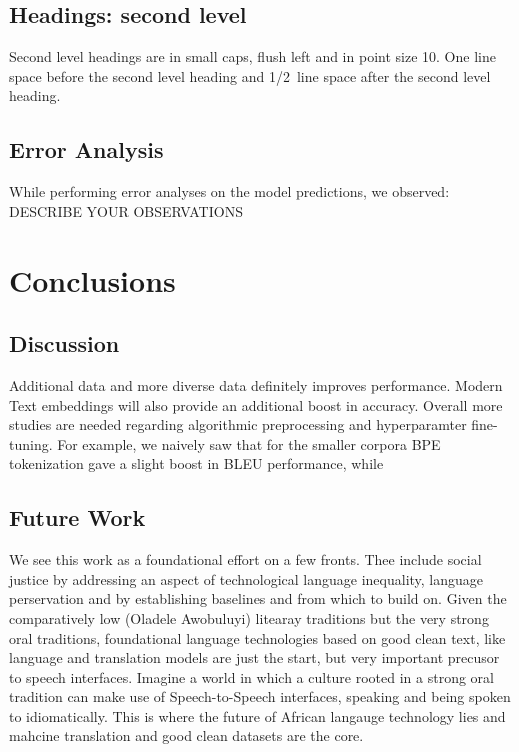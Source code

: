 \documentclass{article} %
\begin{document}
\subsection{Headings: second level}

Second level headings are in small caps,
flush left and in point size 10. One line space before the second level
heading and 1/2~line space after the second level heading.

\subsection{Error Analysis}
While performing error analyses on the model predictions, we observed: DESCRIBE YOUR OBSERVATIONS

\section{Conclusions}


\subsection{Discussion}
Additional data and more diverse data definitely improves performance. Modern Text embeddings will also provide an additional boost in accuracy. Overall more studies are needed regarding algorithmic preprocessing and hyperparamter fine-tuning. For example, we naively saw that for the smaller corpora BPE tokenization gave a slight boost in BLEU performance, while 


\subsection{Future Work}
We see this work as a foundational effort on a few fronts. Thee include social justice by addressing an aspect of technological language inequality, language perservation and by establishing baselines and from which to build on. Given the comparatively low (Oladele Awobuluyi) litearay traditions but the very strong oral traditions, foundational language technologies based on good clean text, like language and translation models are just the start, but very important precusor to speech interfaces. Imagine a world in which a culture rooted in a strong oral tradition can make use of Speech-to-Speech interfaces, speaking and being spoken to idiomatically. This is where the future of African langauge technology lies and mahcine translation and good clean datasets are the core.   
\end{document}
